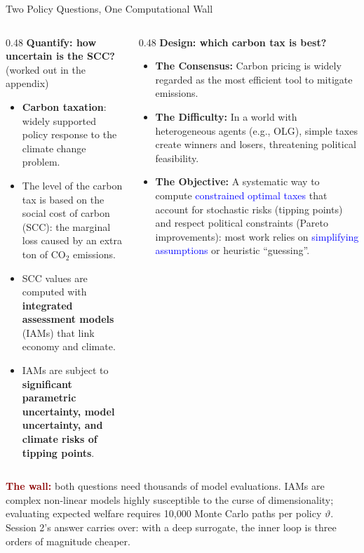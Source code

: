 \documentclass[10pt,aspectratio=169]{beamer}
\newcommand{\emphc}[1]{\textbf{\textcolor{darkred}{#1}}}
\newcommand{\key}[1]{\textbf{\textcolor{uzhblue}{#1}}}
\begin{document}
\begin{frame}{Two Policy Questions, One Computational Wall}
\footnotesize
\begin{columns}[t]
\begin{column}{0.48\textwidth}
\textbf{Quantify: how uncertain is the SCC?} {\tiny (worked out in the appendix)}
\begin{itemize}\itemsep3pt
  \item \key{Carbon taxation}: widely supported policy response to the climate change problem.
  \item The level of the carbon tax is based on the social cost of carbon (SCC): the marginal loss caused by an extra ton of CO$_2$ emissions.
  \item SCC values are computed with \key{integrated assessment models} (IAMs) that link economy and climate.
  \item IAMs are subject to \key{significant parametric uncertainty, model uncertainty, and climate risks of tipping points}.
\end{itemize}
\end{column}
\begin{column}{0.48\textwidth}
\textbf{Design: which carbon tax is best?}
\begin{itemize}\itemsep3pt
  \item \textbf{The Consensus:} Carbon pricing is widely regarded as the most efficient tool to mitigate emissions.
  \item \textbf{The Difficulty:} In a world with heterogeneous agents (e.g., OLG), simple taxes create winners and losers, threatening political feasibility.
  \item \textbf{The Objective:} A systematic way to compute \textcolor{blue}{constrained optimal taxes} that account for stochastic risks (tipping points) and respect political constraints (Pareto improvements): most work relies on \textcolor{blue}{simplifying assumptions} or heuristic ``guessing''.
\end{itemize}
\end{column}
\end{columns}
\vspace{0.6em}
\emphc{The wall:} both questions need thousands of model evaluations. IAMs are complex non-linear models highly susceptible to the curse of dimensionality; evaluating expected welfare requires 10{,}000 Monte Carlo paths per policy $\vartheta$. Session 2's answer carries over: with a deep surrogate, the inner loop is three orders of magnitude cheaper.
\end{frame}
\end{document}
